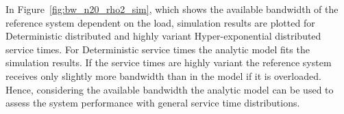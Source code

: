 In Figure~\ref{fig:bw_n20_rho2_sim}, which shows the available bandwidth of the reference system dependent on the load, simulation results are plotted for Deterministic distributed and highly variant Hyper-exponential distributed service times.
For Deterministic service times the analytic model fits the simulation results. If the service times are highly variant the reference system receives only slightly more bandwidth than in the model if it is overloaded. Hence, considering the available bandwidth the analytic model can be used to assess the system performance with general service time distributions.

